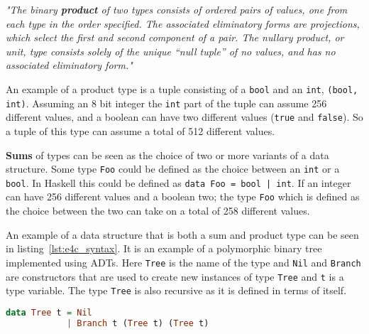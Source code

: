 \documentclass[10pt]{report}
\def\code#1{\texttt{#1}} %
\begin{document}
\par{\textit{"The binary \textbf{product} of two types consists of ordered pairs of values, one from each type in the order specified. The associated eliminatory forms are projections, which select the first and second component of a pair. The nullary product, or unit, type consists solely of the unique “null tuple” of no values, and has no associated eliminatory form."}}
\par{An example of a product type is a tuple consisting of a \code{bool} and an \code{int}, \code{(bool, int)}. Assuming an 8 bit integer the \code{int} part of the tuple can assume 256 different values, and a boolean can have two different values (\code{true} and \code{false}). So a tuple of this type can assume a total of 512 different values.}
\par{\textbf{Sums} of types can be seen as the choice of two or more variants of a data structure. Some type \code{Foo} could be defined as the choice between an \code{int} or a \code{bool}. In Haskell this could be defined as \code{data Foo = bool | int}. If an integer can have 256 different values and a boolean two; the type \code{Foo} which is defined as the choice between the two can take on a total of 258 different values.}

\par{An example of a data structure that is both a sum and product type can be seen in listing~\ref{lst:e4c_syntax}. It is an example of a polymorphic binary tree implemented using ADTs. Here \code{Tree} is the name of the type and \code{Nil} and \code{Branch} are constructors that are used to create new instances of type \code{Tree} and \code{t} is a type variable. The type \code{Tree} is also recursive as it is defined in terms of itself.}


\begin{lstlisting}[language=Haskell,caption={Binary tree definition in Haskell},label={lst:e4c_syntax}]
data Tree t = Nil
            | Branch t (Tree t) (Tree t)
\end{lstlisting}
\end{document}
